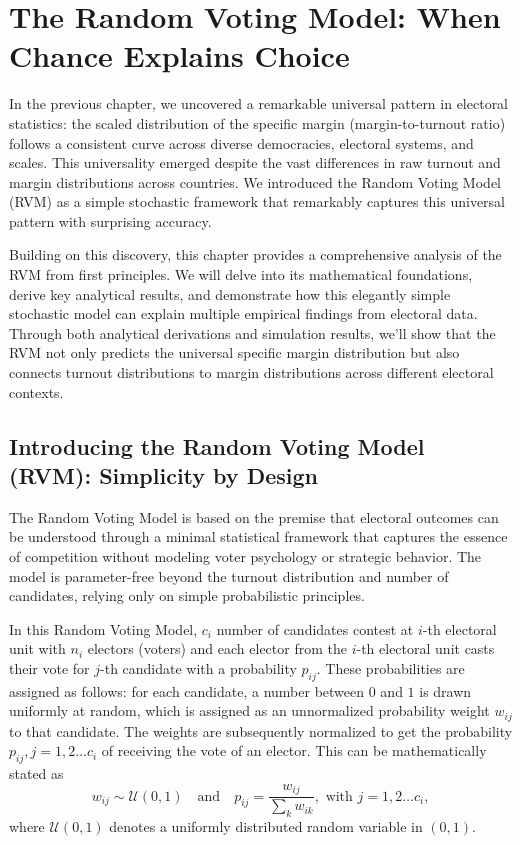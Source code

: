 \chapter{The Random Voting Model: When Chance Explains Choice}
\label{chap5}

In the previous chapter, we uncovered a remarkable universal pattern in electoral statistics: the scaled distribution of the specific margin (margin-to-turnout ratio) follows a consistent curve across diverse democracies, electoral systems, and scales. This universality emerged despite the vast differences in raw turnout and margin distributions across countries. We introduced the Random Voting Model (RVM) as a simple stochastic framework that remarkably captures this universal pattern with surprising accuracy.

Building on this discovery, this chapter provides a comprehensive analysis of the RVM from first principles. We will delve into its mathematical foundations, derive key analytical results, and demonstrate how this elegantly simple stochastic model can explain multiple empirical findings from electoral data. Through both analytical derivations and simulation results, we'll show that the RVM not only predicts the universal specific margin distribution but also connects turnout distributions to margin distributions across different electoral contexts.

\section{Introducing the Random Voting Model (RVM): Simplicity by Design}
\label{sec:RVM_intro}
The Random Voting Model is based on the premise that electoral outcomes can be understood through a minimal statistical framework that captures the essence of competition without modeling voter psychology or strategic behavior. The model is parameter-free beyond the turnout distribution and number of candidates, relying only on simple probabilistic principles.

In this Random Voting Model, $c_i$ number of candidates contest at $i$-th electoral unit with $n_i$ electors (voters) and each elector from the $i$-th electoral unit casts their vote for $j$-th candidate with a probability $p_{ij}$. These probabilities are assigned as follows: for each candidate, a number between $0$ and $1$ is drawn uniformly at random, which is assigned as an unnormalized probability weight $w_{ij}$ to that candidate. The weights are subsequently normalized to get the probability $p_{ij}, j = 1, 2 \dots c_i$ of receiving the vote of an elector. This can be mathematically stated as
\begin{equation}
    w_{ij} \sim \mathcal{U}(0, 1) \quad \text{and} \quad p_{ij} = \frac{w_{ij}}{\sum_k w_{ik}}, \text{ with } j = 1, 2 \dots c_i,
    \label{eq:RVM_prob}
\end{equation}
where $\mathcal{U}(0, 1)$ denotes a uniformly distributed random variable in $(0,1)$.

